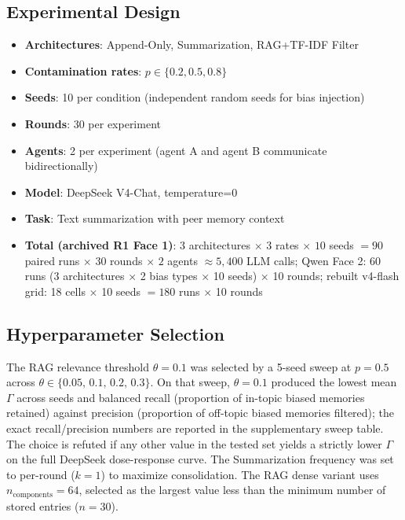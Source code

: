 \documentclass[11pt]{article}
\begin{document}
\subsection{Experimental Design}

\begin{itemize}[nosep]
    \item \textbf{Architectures}: Append-Only, Summarization, RAG+TF-IDF Filter
    \item \textbf{Contamination rates}: $p \in \{0.2, 0.5, 0.8\}$
    \item \textbf{Seeds}: 10 per condition (independent random seeds for bias injection)
    \item \textbf{Rounds}: 30 per experiment
    \item \textbf{Agents}: 2 per experiment (agent A and agent B communicate bidirectionally)
    \item \textbf{Model}: DeepSeek V4-Chat, temperature=0
    \item \textbf{Task}: Text summarization with peer memory context
    \item \textbf{Total (archived R1 Face 1)}: $3$ architectures $\times$ $3$ rates $\times$ $10$ seeds $= 90$ paired runs $\times$ $30$ rounds $\times$ $2$ agents $\approx 5{,}400$ LLM calls; Qwen Face 2: 60 runs (3 architectures $\times$ 2 bias types $\times$ 10 seeds) $\times$ 10 rounds; rebuilt v4-flash grid: 18 cells $\times$ 10 seeds $= 180$ runs $\times$ 10 rounds
\end{itemize}

\subsection{Hyperparameter Selection}
\label{sec:hyperparams}

The RAG relevance threshold $\theta = 0.1$ was selected by a 5-seed sweep at $p=0.5$ across $\theta \in \{0.05,\,0.1,\,0.2,\,0.3\}$. On that sweep, $\theta = 0.1$ produced the lowest mean $\Gamma$ across seeds and balanced recall (proportion of in-topic biased memories retained) against precision (proportion of off-topic biased memories filtered); the exact recall/precision numbers are reported in the supplementary sweep table. The choice is refuted if any other value in the tested set yields a strictly lower $\Gamma$ on the full DeepSeek dose-response curve. The Summarization frequency was set to per-round ($k=1$) to maximize consolidation. The RAG dense variant uses $n_{\text{components}} = 64$, selected as the largest value less than the minimum number of stored entries ($n=30$).
\end{document}
